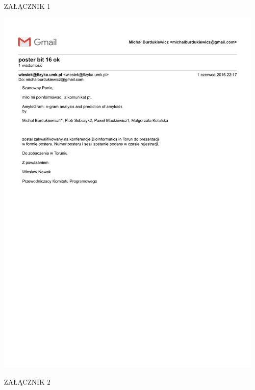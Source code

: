 \documentclass[12pt]{article}
\begin{document}
\large{ZAŁĄCZNIK 1}

\begin{center}
\includegraphics[width=0.95\linewidth]{amyloids/BIT2016.pdf}
\end{center}
\clearpage


\large{ZAŁĄCZNIK 2}
\end{document}
